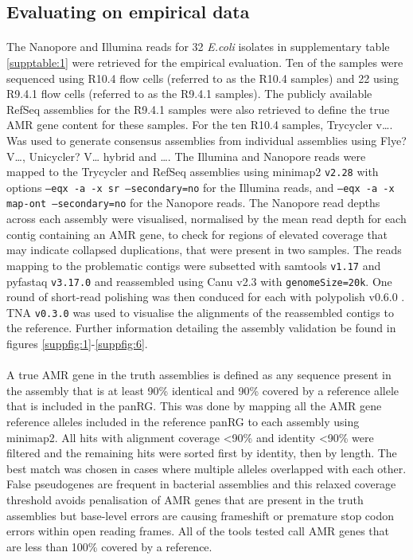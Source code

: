 \subsection*{Evaluating on empirical data}
\paragraph{}
The Nanopore and Illumina reads for 32 \textit{E.coli} isolates in supplementary table \ref{supptable:1} were retrieved for the empirical evaluation. Ten of the samples were sequenced using R10.4 flow cells (referred to as the R10.4 samples) and 22 using R9.4.1 flow cells (referred to as the R9.4.1 samples). The publicly available RefSeq assemblies for the R9.4.1 samples were also retrieved to define the true AMR gene content for these samples. For the ten R10.4 samples, Trycycler v…. Was used to generate consensus assemblies from individual assemblies using Flye? V…, Unicycler? V… hybrid and …. The Illumina and Nanopore reads were mapped to the Trycycler and RefSeq assemblies using minimap2 \texttt{v2.28} \cite{10.1093/bioinformatics/bty191} with options \texttt{--eqx -a -x sr --secondary=no} for the Illumina reads, and \texttt{--eqx -a -x map-ont --secondary=no} for the Nanopore reads. The Nanopore read depths across each assembly were visualised, normalised by the mean read depth for each contig containing an AMR gene, to check for regions of elevated coverage that may indicate collapsed duplications, that were present in two samples. The reads mapping to the problematic contigs were subsetted with samtools \texttt{v1.17} \cite{Li2009} and pyfastaq \texttt{v3.17.0} and reassembled using Canu v2.3 \cite{Koren2017} with \texttt{genomeSize=20k}. One round of short-read polishing was then conduced for each with polypolish v0.6.0 \cite{10.1099/mgen.0.001254}. TNA \texttt{v0.3.0} \cite{TNA} was used to visualise the alignments of the reassembled contigs to the reference. Further information detailing the assembly validation be found in figures \ref{suppfig:1}-\ref{suppfig:6}.
\paragraph{}
A true AMR gene in the truth assemblies is defined as any sequence present in the assembly that is at least 90\% identical and 90\% covered by a reference allele that is included in the panRG. This was done by mapping all the AMR gene reference alleles included in the reference panRG to each assembly using minimap2. All hits with alignment coverage <90\% and identity <90\% were filtered and the remaining hits were sorted first by identity, then by length. The best match was chosen in cases where multiple alleles overlapped with each other. False pseudogenes are frequent in bacterial assemblies \cite{Cooley2024} and this relaxed coverage threshold avoids penalisation of AMR genes that are present in the truth assemblies but base-level errors are causing frameshift or premature stop codon errors within open reading frames. All of the tools tested call AMR genes that are less than 100\% covered by a reference. 
